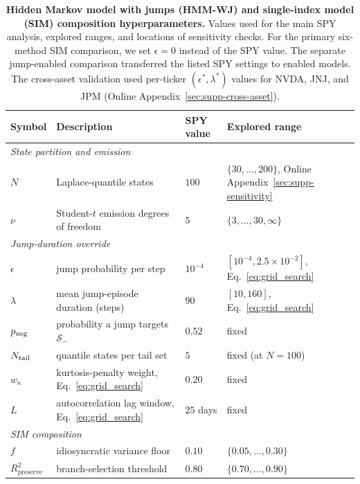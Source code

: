 
\begin{table}[H]
\centering
\caption{\textbf{Hidden Markov model with jumps (HMM-WJ) and
    single-index model (SIM) composition hyperparameters.} Values
    used for the main SPY analysis, explored ranges, and locations of
    sensitivity checks. For the primary six-method SIM comparison, we set
    $\epsilon = 0$ instead of the SPY value. The separate jump-enabled
    comparison transferred the listed SPY settings to enabled models. The cross-asset
    validation used per-ticker $(\epsilon^{*}, \lambda^{*})$ values
    for NVDA, JNJ, and JPM (Online Appendix~\ref{sec:supp-cross-asset}).}
\label{tab:hyperparams}
\small
\begin{tabular}{@{}llll@{}}
\toprule
\textbf{Symbol} & \textbf{Description} & \textbf{SPY value} & \textbf{Explored range} \\ \midrule
\multicolumn{4}{l}{\textit{State partition and emission}} \\[2pt]
$N$            & Laplace-quantile states                      & $100$     & $\{30,\dots,200\}$, Online Appendix~\ref{sec:supp-sensitivity} \\
$\nu$          & Student-$t$ emission degrees of freedom      & $5$       & $\{3,\dots,30,\infty\}$ \\[4pt]
\multicolumn{4}{l}{\textit{Jump-duration override}} \\[2pt]
$\epsilon$     & jump probability per step                    & $10^{-4}$ & $[10^{-4}, 2.5\times10^{-2}]$, Eq.~\eqref{eq:grid_search} \\
$\lambda$      & mean jump-episode duration (steps)           & $90$      & $[10, 160]$, Eq.~\eqref{eq:grid_search} \\
$p_{\rm neg}$  & probability a jump targets $\mathcal{S}_{-}$ & $0.52$    & fixed \\
$N_{\rm tail}$ & quantile states per tail set                 & $5$       & fixed (at $N = 100$) \\
$w_\kappa$     & kurtosis-penalty weight, Eq.~\eqref{eq:grid_search} & $0.20$ & fixed \\
$L$            & autocorrelation lag window, Eq.~\eqref{eq:grid_search} & $25$ days & fixed \\[4pt]
\multicolumn{4}{l}{\textit{SIM composition}} \\[2pt]
$f$                        & idiosyncratic variance floor & $0.10$ & $\{0.05,\dots,0.30\}$ \\
$R^2_{\mathrm{preserve}}$  & branch-selection threshold   & $0.80$ & $\{0.70,\dots,0.90\}$ \\
\bottomrule
\end{tabular}
\end{table}


